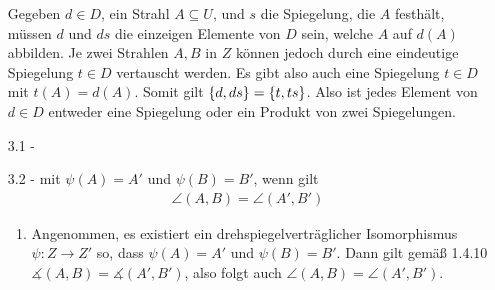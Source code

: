 \documentclass{article}
\begin{document}
\begin{enumerate}
		Gegeben $d \in D$, ein Strahl $A \subseteq U$, und $s$ die Spiegelung, die $A$ festhält, müssen $d$ und $ds$ die einzeigen Elemente von $D$ sein, welche $A$ auf $d(A)$ abbilden. Je zwei Strahlen $A,B$ in $Z$ können jedoch durch eine eindeutige Spiegelung $t \in D$ vertauscht werden. Es gibt also auch eine Spiegelung $t \in D$ mit $t(A) = d(A)$. Somit gilt $\lr{d,ds} = \lr{t,ts}$. Also ist jedes Element von $d \in D$ entweder eine Spiegelung oder ein Produkt von zwei Spiegelungen.
				\item[3.1 - \tbf{2}]
		\item[3.2 - \tbf{3}]  mit $\psi(A) = A'$ und $\psi(B) = B'$, wenn gilt
		\begin{align*}
			\angle(A,B) = \angle(A',B')
		\end{align*}
		\begin{enumerate}
			\item
			 Angenommen, es existiert ein drehspiegelverträglicher Isomorphismus $\psi : Z \to Z'$ so, dass $\psi(A) = A'$ und $\psi(B) = B'$. 
			 Dann gilt gemäß 1.4.10 $\measuredangle(A,B) = \measuredangle(A',B')$, also folgt auch $\angle(A,B) = \angle(A',B')$.
			 

\end{enumerate}
\end{enumerate}
\end{document}
